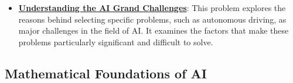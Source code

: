 \documentclass{article}%
\begin{document}
\begin{itemize}[leftmargin=*]
\item \href{https://purdue.brightspace.com/d2l/common/assets/pdfjs-d2l-dist/1.0.14-legacy/web/viewer.html?file=%2Fcontent%2Fenforced%2F1095467-wl.202510.CS.24300.001%2F02L2-Intro.pdf%3Fou%3D1095467&lang=en-us&container=d2l-fileviewer-rendered-pdf&fullscreen=d2l-fileviewer-rendered-pdf-dialog&height=667#page=43}{\textbf{Understanding the AI Grand Challenges}}: This problem explores the reasons behind selecting specific problems, such as autonomous driving, as major challenges in the field of AI. It examines the factors that make these problems particularly significant and difficult to solve.%
\end{itemize}

%
\subsection{Mathematical Foundations of AI}%
\label{subsec:MathematicalFoundationsofAI}%
\end{document}
